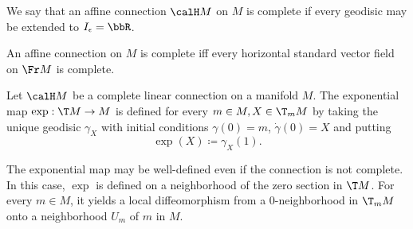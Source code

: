 We say that an affine connection $\calH M$ on $M$ is complete if every geodisic may be extended to $I_\epsilon=\bbR$.

\begin{cor}[{{\cite[Cor.~2.1.24]{RS2}}}]\label{cor 2.1.24 RS2}
    An affine connection on $M$ is complete iff every horizontal standard vector field on $\Fr M$ is complete.
\end{cor}


\begin{defn}
    Let $\calH M$ be a complete linear connection on a manifold $M$. The exponential map $\exp: \T M\to M$ is defined for every $m\in M, X\in \T_mM$ by taking the unique geodisic $\gamma_X$ with initial conditions $\gamma(0)=m$, $\dot\gamma(0)=X$ and putting 
    \[\exp(X)\coloneqq \gamma_X(1).\]
\end{defn}

\begin{rem}
    The exponential map may be well-defined even if the connection is not complete. In this case, $\exp$ is defined on a neighborhood of the zero section in $\T M$. For every $m\in M$, it yields a local diffeomorphism from a $0$-neighborhood in $\T_m M$ onto a neighborhood $U_m$ of $m$ in $M$.
\end{rem}



